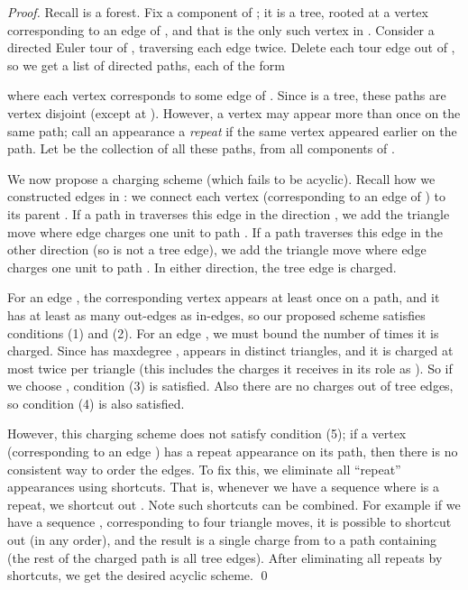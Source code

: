 \documentclass{llncs}
\begin{document}
\begin{proof}
Recall  is a forest.  Fix a component  of ; it is
a tree, rooted at a vertex  corresponding to an edge of , and
that is the only such vertex in .  Consider a directed Euler tour
of , traversing each edge twice.  Delete each tour edge out of ,
so we get a list of directed paths, each of the form

where each vertex  corresponds to some edge of .  Since 
is a tree, these paths are vertex disjoint (except at ).  However,
a vertex may appear more than once on the same path; call an
appearance  a \emph{repeat} if the same vertex appeared earlier
on the path.  Let  be the collection of all these paths,
from all components of .

We now propose a charging scheme (which fails to be acyclic).  Recall
how we constructed edges in : we connect each vertex 
(corresponding to an edge of ) to its parent .  If a path in
 traverses this edge in the direction , we add the triangle move where edge  charges one unit
to path .  If a path traverses this edge in the other
direction  (so  is not a tree edge), we
add the triangle move where edge  charges one unit to path .
In either direction, the tree edge  is charged.

For an edge , the corresponding vertex appears at least
once on a path, and it has at least as many out-edges as in-edges, so
our proposed scheme satisfies conditions (1) and (2).  For an edge , we must bound the number of times it is charged.  Since  has
maxdegree ,  appears in  distinct triangles, and it is
charged at most twice per triangle (this includes the charges it
receives in its role as ).  So if we choose , condition (3) is satisfied.
Also there are no charges out of tree edges, so condition (4) is also satisfied.

However, this charging scheme does not satisfy condition (5); if a vertex
(corresponding to an edge ) has a repeat appearance on its
path, then there is no consistent way to order the edges.  To fix
this, we eliminate all ``repeat'' appearances using shortcuts.
That is, whenever we have a sequence  where  is a repeat, we shortcut out .
Note such shortcuts can be combined.  For example if we have a sequence
,
corresponding to four triangle moves, it is possible to shortcut out
 (in any order), and the result is a single charge from
 to a path containing  (the rest of the charged path is all
tree edges).  After eliminating all repeats by shortcuts, we get the
desired acyclic scheme.
\qed
\end{proof}
\end{document}
